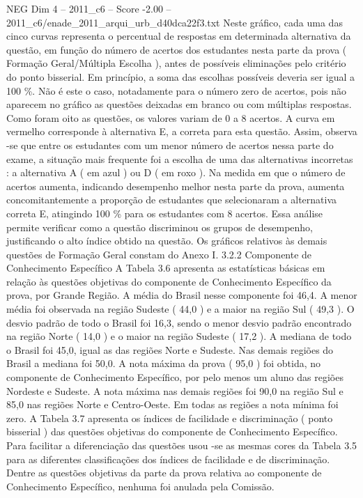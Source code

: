 \begin{textsample}{NEG Dim 4 – 2011\_c6 – Score -2.00 – 2011\_c6/enade\_2011\_arqui\_urb\_d40dca22f3.txt}
Neste gráfico, cada uma das cinco curvas representa o percentual de respostas em determinada alternativa da questão, em função do número de acertos dos estudantes nesta parte da prova ( Formação Geral/Múltipla Escolha ), antes de possíveis eliminações pelo critério do ponto bisserial.
Em princípio, a soma das escolhas possíveis deveria ser igual a 100 \%.
Não é este o caso, notadamente para o número zero de acertos, pois não aparecem no gráfico as questões deixadas em branco ou com múltiplas respostas.
Como foram oito as questões, os valores variam de 0 a 8 acertos.
A curva em vermelho corresponde à alternativa E, a correta para esta questão.
Assim, observa -se que entre os estudantes com um menor número de acertos nessa parte do exame, a situação mais frequente foi a escolha de uma das alternativas incorretas : a alternativa A ( em azul ) ou D ( em roxo ).
Na medida em que o número de acertos aumenta, indicando desempenho melhor nesta parte da prova, aumenta concomitantemente a proporção de estudantes que selecionaram a alternativa correta E, atingindo 100 \% para os estudantes com 8 acertos.
Essa análise permite verificar como a questão discriminou os grupos de desempenho, justificando o alto índice obtido na questão.
Os gráficos relativos às demais questões de Formação Geral constam do Anexo I. 3.2.2 Componente de Conhecimento Específico A Tabela 3.6 apresenta as estatísticas básicas em relação às questões objetivas do componente de Conhecimento Específico da prova, por Grande Região.
A média do Brasil nesse componente foi 46,4.
A menor média foi observada na região Sudeste ( 44,0 ) e a maior na região Sul ( 49,3 ).
O desvio padrão de todo o Brasil foi 16,3, sendo o menor desvio padrão encontrado na região Norte ( 14,0 ) e o maior na região Sudeste ( 17,2 ).
A mediana de todo o Brasil foi 45,0, igual as das regiões Norte e Sudeste.
Nas demais regiões do Brasil a mediana foi 50,0.
A nota máxima da prova ( 95,0 ) foi obtida, no componente de Conhecimento Específico, por pelo menos um aluno das regiões Nordeste e Sudeste.
A nota máxima nas demais regiões foi 90,0 na região Sul e 85,0 nas regiões Norte e Centro-Oeste.
Em todas as regiões a nota mínima foi zero.
A Tabela 3.7 apresenta os índices de facilidade e discriminação ( ponto bisserial ) das questões objetivas do componente de Conhecimento Específico.
Para facilitar a diferenciação das questões usou -se as mesmas cores da Tabela 3.5 para as diferentes classificações dos índices de facilidade e de discriminação.
Dentre as questões objetivas da parte da prova relativa ao componente de Conhecimento Específico, nenhuma foi anulada pela Comissão.

\end{textsample}
